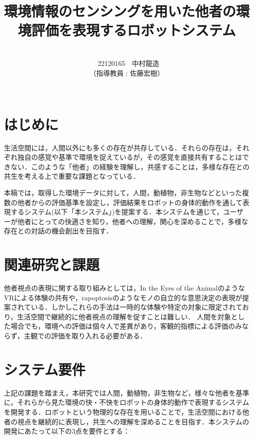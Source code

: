 \documentclass[paper=a4paper,jafontsize=9pt,head_space=15mm,gutter=20mm,
twocolumn,number_of_lines=49, line_length=26zw]{myuarticle}
\begin{document}
\title{{\Large\bfseries\gtfamily 環境情報のセンシングを用いた他者の環境評価を表現するロボットシステム}}
\author{\\\ 22120165　中村龍造 \\ （指導教員 : 佐藤宏樹）\\ \\}
\date{}
\maketitle

\section{はじめに}
生活空間には，人間以外にも多くの存在が共存している．それらの存在は，それぞれ独自の感覚や基準で環境を捉えているが，その感覚を直接共有することはできない．このような「他者」の経験を理解し，共感することは，多様な存在との共生を考える上で重要な課題となっている．

本稿では，取得した環境データに対して，人間，動植物，非生物などといった複数の他者からの評価基準を設定し，評価結果をロボットの身体的動作を通して表現するシステム(以下「本システム」)を提案する．本システムを通じて，ユーザーが他者にとっての快適さを知り，他者への理解，関心を深めることで，多様な存在との対話の機会創出を目指す．

\section{関連研究と課題}

他者視点の表現に関する取り組みとしては，In the Eyes of the Animal\cite{Dezeen-2015-MarshmallowLaserFeastsEyes}のようなVRによる体験の共有や，rapoptosis\cite{--ソンヨン}のようなモノの自立的な意思決定の表現が提案されている．しかしこれらの手法は一時的な体験や特定の対象に限定されており，生活空間で継続的に他者視点の理解を促すことは難しい．
人間を対象とした場合でも，環境への評価は個々人で差異があり，客観的指標による評価のみならず，主観での評価を取り入れる必要がある\cite{Coulby-2020-ScopingReviewTechnologicalApproaches}．

\section{システム要件}

上記の課題を踏まえ，本研究では人間，動植物，非生物など，様々な他者を基準に，それらから見た環境の快・不快をロボットの身体的動作で表現するシステムを開発する．ロボットという物理的な存在を用いることで，生活空間における他者の視点を継続的に表現し，共生への理解を深めることを目指す．本システムの開発にあたって以下の3点を要件とする：
\end{document}

